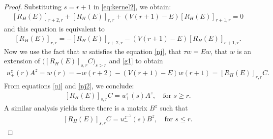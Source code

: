 \documentclass[12pt,oneside,onecolumn,open]{article}
\begin{document}
\begin{proof}
Substituting \(s = r+1\) in \eqref{eq:kernel2}, we obtain:
\begin{align}\label{g}
     [R_{H}(E)]_{r+2,r} + [R_{H}(E)]_{r,r} + (V(r+1) - E)[R_{H}(E)]_{ r+1,r} = 0
\end{align}
  and this equation is equivalent to 
  \begin{align}\label{g1}
      [R_{H}(E)]_{r,r} =-  [R_{H}(E)]_{r+2,r}-(V(r+1) - E)[R_{H}(E)]_{r+1,r}.
\end{align}
Now we use the fact that $w$ satisfies the equation  \eqref{nj}, that  $\tau w=Ew$, that $  w $ is an extension   of  \( \Big (  [R_{H}(E)]_{s,r}C \Big )_ {s>r}\) and  \eqref{g1} to obtain 
    \begin{align}\label{nj2}
u_{+}^{z}(r) A^{z} = w(r) = - w(r+2) -(V(r+1) - E ) w(r+1) =      [R_{H}(E)]_{r,r}C .
\end{align}
From equations \eqref{nj} and \eqref{nj2}, we conclude:
\begin{align} \label{nj3}
     [R_{H}(E)]_{s,r}C = u_{+}^{z}(s) A^{z}, \quad \text{for } s \geq r.
\end{align}
A similar analysis yields there there is a matrix $B^z$ such that 
\begin{align} \label{nj4}
     [R_{H}(E)]_{s,r}C= u_{-}^{z^{-1}}(s) B^{z}, \quad \text{for } s \leq r.
\end{align}


\end{proof}
\end{document}
